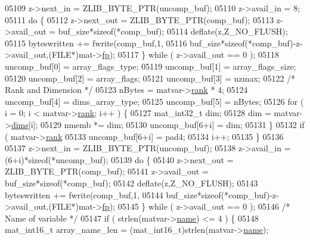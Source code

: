 \begin{DoxyCode}
{{{{{{{{{{{{{{{{{{{{{{{{{{{{{{{05109         z->next\_in  = ZLIB\_BYTE\_PTR(uncomp\_buf);
05110         z->avail\_in = 8;
05111         \textcolor{keywordflow}{do} \{
05112             z->next\_out  = ZLIB\_BYTE\_PTR(comp\_buf);
05113             z->avail\_out = buf\_size*\textcolor{keyword}{sizeof}(*comp\_buf);
05114             deflate(z,Z\_NO\_FLUSH);
05115             byteswritten += fwrite(comp\_buf,1,
05116                 buf\_size*\textcolor{keyword}{sizeof}(*comp\_buf)-z->avail\_out,(FILE*)mat->\hyperlink{struct__mat__t_a85f562e407ca9ad4d2a6e14f839432b7}{fp});
05117         \} \textcolor{keywordflow}{while} ( z->avail\_out == 0 );
05118         uncomp\_buf[0] = array\_flags\_type;
05119         uncomp\_buf[1] = array\_flags\_size;
05120         uncomp\_buf[2] = array\_flags;
05121         uncomp\_buf[3] = nzmax;
05122         \textcolor{comment}{/* Rank and Dimension */}
05123         nBytes = matvar->\hyperlink{group___m_a_t_a84ba70c96ded13cc555fa75b768d9921}{rank} * 4;
05124         uncomp\_buf[4] = dims\_array\_type;
05125         uncomp\_buf[5] = nBytes;
05126         \textcolor{keywordflow}{for} ( i = 0; i < matvar->\hyperlink{group___m_a_t_a84ba70c96ded13cc555fa75b768d9921}{rank}; i++ ) \{
05127             mat\_int32\_t dim;
05128             dim = matvar->\hyperlink{group___m_a_t_a8e01234e1c862ce3472bb37f5a09b92c}{dims}[i];
05129             nmemb *= dim;
05130             uncomp\_buf[6+i] = dim;
05131         \}
05132         \textcolor{keywordflow}{if} ( matvar->\hyperlink{group___m_a_t_a84ba70c96ded13cc555fa75b768d9921}{rank} %
05133             uncomp\_buf[6+i] = pad4;
05134             i++;
05135         \}
05136 
05137         z->next\_in  = ZLIB\_BYTE\_PTR(uncomp\_buf);
05138         z->avail\_in = (6+i)*\textcolor{keyword}{sizeof}(*uncomp\_buf);
05139         \textcolor{keywordflow}{do} \{
05140             z->next\_out  = ZLIB\_BYTE\_PTR(comp\_buf);
05141             z->avail\_out = buf\_size*\textcolor{keyword}{sizeof}(*comp\_buf);
05142             deflate(z,Z\_NO\_FLUSH);
05143             byteswritten += fwrite(comp\_buf,1,
05144                 buf\_size*\textcolor{keyword}{sizeof}(*comp\_buf)-z->avail\_out,(FILE*)mat->\hyperlink{struct__mat__t_a85f562e407ca9ad4d2a6e14f839432b7}{fp});
05145         \} \textcolor{keywordflow}{while} ( z->avail\_out == 0 );
05146         \textcolor{comment}{/* Name of variable */}
05147         \textcolor{keywordflow}{if} ( strlen(matvar->\hyperlink{group___m_a_t_a5d4b55b041e3b4fb50c04337f05ad909}{name}) <= 4 ) \{
05148             mat\_int16\_t array\_name\_len = (mat\_int16\_t)strlen(matvar->\hyperlink{group___m_a_t_a5d4b55b041e3b4fb50c04337f05ad909}{name});
}}}}}}}}}}}}}}}}}}}}}}}}}}}}}}}
\end{DoxyCode}
